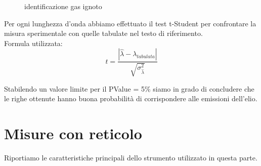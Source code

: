 \documentclass[a4paper]{article}
\theoremstyle{definition}
\begin{document}
\begin{figure}[!htbp]
\captionsetup{labelformat=empty}
    	\caption{identificazione gas ignoto}
    \end{figure}

\noindent Per ogni lunghezza d'onda abbiamo effettuato il test t-Student per confrontare la misura sperimentale con quelle tabulate nel testo di riferimento. \\
Formula utilizzata: 
\[t = \frac{\left| \hat{\lambda} - \lambda_{tabulata} \right|}{\sqrt{\sigma^{2}_{\hat{\lambda}}}}\]

\noindent Stabilendo un valore limite per il PValue = 5\% siamo in grado di concludere che le righe ottenute hanno buona probabilità di corrispondere alle emissioni dell'elio. \\




\section{Misure con reticolo}
\noindent Riportiamo le caratteristiche principali dello strumento utilizzato in questa parte. \\
\end{document}
